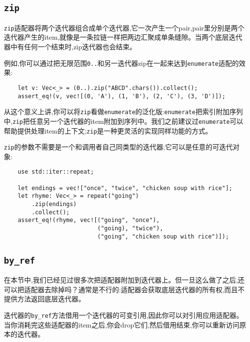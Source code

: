 \subsection{\texttt{zip}}
\texttt{zip}适配器将两个迭代器组合成单个迭代器,它一次产生一个pair,pair里分别是两个迭代器产生的item,就像是一条拉链一样把两边汇聚成单条缝隙。当两个底层迭代器中有任何一个结束时,zip迭代器也会结束。

例如,你可以通过把无限范围\texttt{0..}和另一迭代器zip在一起来达到\texttt{enumerate}适配的效果:
\begin{verbatim}
    let v: Vec<_> = (0..).zip("ABCD".chars()).collect();
    assert_eq!(v, vec![(0, 'A'), (1, 'B'), (2, 'C'), (3, 'D')]);
\end{verbatim}

从这个意义上讲,你可以将\texttt{zip}看做\texttt{enumerate}的泛化版:\texttt{enumerate}把索引附加序列中,\texttt{zip}把任意另一个迭代器的item附加到序列中。我们之前建议过\texttt{enumerate}可以帮助提供处理item的上下文;\texttt{zip}是一种更灵活的实现同样功能的方式。

\texttt{zip}的参数不需要是一个和调用者自己同类型的迭代器;它可以是任意的可迭代对象:
\begin{verbatim}
    use std::iter::repeat;

    let endings = vec!["once", "twice", "chicken soup with rice"];
    let rhyme: Vec<_> = repeat("going")
        .zip(endings)
        .collect();
    assert_eq!(rhyme, vec![("going", "once"),
                           ("going), "twice"),
                           ("going", "chicken soup with rice")]);
\end{verbatim}

\subsection{\texttt{by\_ref}}
在本节中,我们已经见过很多次把适配器附加到迭代器上。但一旦这么做了之后,还可以把适配器去除掉吗？通常是不行的:适配器会获取底层迭代器的所有权,而且不提供方法返回底层迭代器。

迭代器的\texttt{by\_ref}方法借用一个迭代器的可变引用,因此你可以对引用应用适配器。当你消耗完这些适配器的item之后,你会drop它们,然后借用结束,你可以重新访问原本的迭代器。

